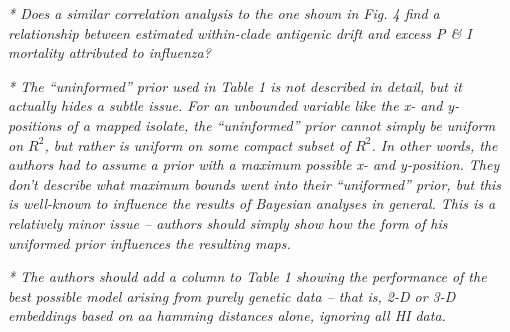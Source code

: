 \documentclass[11pt,oneside,letterpaper]{article}
\begin{document}
\textsl{* Does a similar correlation analysis to the one shown in Fig. 4 find a relationship between estimated within-clade antigenic drift and excess P \& I mortality attributed to influenza?}

\textsl{* The ``uninformed'' prior used in Table 1 is not described in detail, but it actually hides a subtle issue. For an unbounded variable like the x- and y- positions of a mapped isolate, the ``uninformed'' prior cannot simply be uniform on $R^2$, but rather is uniform on some compact subset of $R^2$. In other words, the authors had to assume a prior with a maximum possible x- and y-position. They don't describe what maximum bounds went into their ``uniformed'' prior, but this is well-known to influence the results of Bayesian analyses in general. This is a relatively minor issue -- authors should simply show how the form of his uniformed prior influences the resulting maps.}

\textsl{* The authors should add a column to Table 1 showing the performance of the best possible model arising from purely genetic data -- that is, 2-D or 3-D embeddings based on aa hamming distances alone, ignoring all HI data.}



\end{document}
